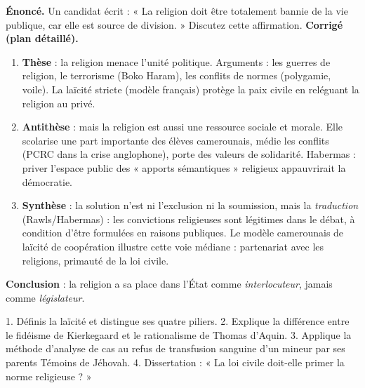 \documentclass[11pt]{article}
\begin{document}
\begin{exoresolu}
\textbf{Énoncé.} Un candidat écrit : « La religion doit être totalement bannie de la vie publique, car elle est source de division. » Discutez cette affirmation.
\tcblower
\textbf{Corrigé (plan détaillé).}
\begin{enumerate}
\item \textbf{Thèse} : la religion menace l'unité politique. Arguments : les guerres de religion, le terrorisme (Boko Haram), les conflits de normes (polygamie, voile). La laïcité stricte (modèle français) protège la paix civile en reléguant la religion au privé.
\item \textbf{Antithèse} : mais la religion est aussi une ressource sociale et morale. Elle scolarise une part importante des élèves camerounais, médie les conflits (PCRC dans la crise anglophone), porte des valeurs de solidarité. Habermas : priver l'espace public des « apports sémantiques » religieux appauvrirait la démocratie.
\item \textbf{Synthèse} : la solution n'est ni l'exclusion ni la soumission, mais la \emph{traduction} (Rawls/Habermas) : les convictions religieuses sont légitimes dans le débat, à condition d'être formulées en raisons publiques. Le modèle camerounais de laïcité de coopération illustre cette voie médiane : partenariat avec les religions, primauté de la loi civile.
\end{enumerate}
\textbf{Conclusion} : la religion a sa place dans l'État comme \emph{interlocuteur}, jamais comme \emph{législateur}.
\end{exoresolu}

\begin{exercice}
1. Définis la laïcité et distingue ses quatre piliers. 2. Explique la différence entre le fidéisme de Kierkegaard et le rationalisme de Thomas d'Aquin. 3. Applique la méthode d'analyse de cas au refus de transfusion sanguine d'un mineur par ses parents Témoins de Jéhovah. 4. Dissertation : « La loi civile doit-elle primer la norme religieuse ? »
\end{exercice}
\end{document}
